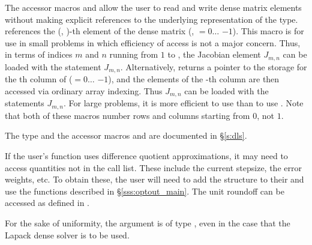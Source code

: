 {{  The accessor macros  and  allow the user to
  read and write dense matrix elements without making explicit
  references to the underlying representation of the 
  type.  references the (, )-th
  element of the dense matrix  (, $= 0\ldots$ $-1$).
  This macro is for use in small problems in which efficiency of access is not a
  major concern.  Thus, in terms of indices $m$ and $n$ running from $1$ to
  , the Jacobian element $J_{m,n}$ can be loaded with the statement
   $J_{m,n}$.  Alternatively,
   returns a pointer to the storage for
  the th column of  ($= 0\ldots$ $-1$), and the 
  elements of the -th column
  are then accessed via ordinary array indexing.  Thus $J_{m,n}$ can be 
  loaded with the statements 
   $J_{m,n}$.  For large problems, it is more 
  efficient to use  than to use . 
  Note that both of these macros number rows and columns
  starting from $0$, not $1$.  

  The  type and the accessor macros  and 
   are documented in \S\ref{s:dls}.

  If the user's  function uses difference quotient approximations,
  it may need to access quantities not in the call list. These include the current
  stepsize, the error weights, etc. 
  To obtain these, the user will need to add the  
  structure to their  and use the  
  functions described in
  \S\ref{sss:optout_main}. The unit roundoff can be accessed
  as  defined in .

  For the sake of uniformity, the argument  is of type ,
  even in the case that the Lapack dense solver is to be used.
}
}
